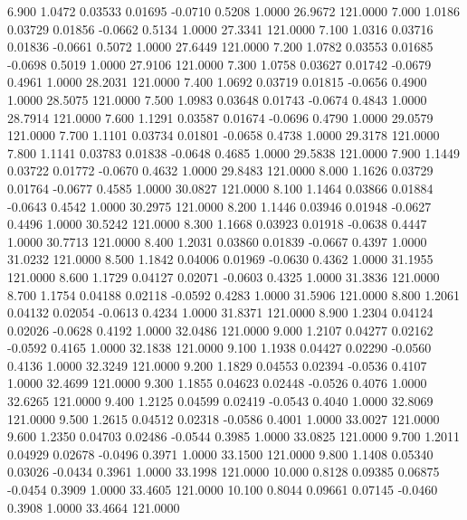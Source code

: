    6.900   1.0472   0.03533   0.01695  -0.0710   0.5208   1.0000  26.9672 121.0000
   7.000   1.0186   0.03729   0.01856  -0.0662   0.5134   1.0000  27.3341 121.0000
   7.100   1.0316   0.03716   0.01836  -0.0661   0.5072   1.0000  27.6449 121.0000
   7.200   1.0782   0.03553   0.01685  -0.0698   0.5019   1.0000  27.9106 121.0000
   7.300   1.0758   0.03627   0.01742  -0.0679   0.4961   1.0000  28.2031 121.0000
   7.400   1.0692   0.03719   0.01815  -0.0656   0.4900   1.0000  28.5075 121.0000
   7.500   1.0983   0.03648   0.01743  -0.0674   0.4843   1.0000  28.7914 121.0000
   7.600   1.1291   0.03587   0.01674  -0.0696   0.4790   1.0000  29.0579 121.0000
   7.700   1.1101   0.03734   0.01801  -0.0658   0.4738   1.0000  29.3178 121.0000
   7.800   1.1141   0.03783   0.01838  -0.0648   0.4685   1.0000  29.5838 121.0000
   7.900   1.1449   0.03722   0.01772  -0.0670   0.4632   1.0000  29.8483 121.0000
   8.000   1.1626   0.03729   0.01764  -0.0677   0.4585   1.0000  30.0827 121.0000
   8.100   1.1464   0.03866   0.01884  -0.0643   0.4542   1.0000  30.2975 121.0000
   8.200   1.1446   0.03946   0.01948  -0.0627   0.4496   1.0000  30.5242 121.0000
   8.300   1.1668   0.03923   0.01918  -0.0638   0.4447   1.0000  30.7713 121.0000
   8.400   1.2031   0.03860   0.01839  -0.0667   0.4397   1.0000  31.0232 121.0000
   8.500   1.1842   0.04006   0.01969  -0.0630   0.4362   1.0000  31.1955 121.0000
   8.600   1.1729   0.04127   0.02071  -0.0603   0.4325   1.0000  31.3836 121.0000
   8.700   1.1754   0.04188   0.02118  -0.0592   0.4283   1.0000  31.5906 121.0000
   8.800   1.2061   0.04132   0.02054  -0.0613   0.4234   1.0000  31.8371 121.0000
   8.900   1.2304   0.04124   0.02026  -0.0628   0.4192   1.0000  32.0486 121.0000
   9.000   1.2107   0.04277   0.02162  -0.0592   0.4165   1.0000  32.1838 121.0000
   9.100   1.1938   0.04427   0.02290  -0.0560   0.4136   1.0000  32.3249 121.0000
   9.200   1.1829   0.04553   0.02394  -0.0536   0.4107   1.0000  32.4699 121.0000
   9.300   1.1855   0.04623   0.02448  -0.0526   0.4076   1.0000  32.6265 121.0000
   9.400   1.2125   0.04599   0.02419  -0.0543   0.4040   1.0000  32.8069 121.0000
   9.500   1.2615   0.04512   0.02318  -0.0586   0.4001   1.0000  33.0027 121.0000
   9.600   1.2350   0.04703   0.02486  -0.0544   0.3985   1.0000  33.0825 121.0000
   9.700   1.2011   0.04929   0.02678  -0.0496   0.3971   1.0000  33.1500 121.0000
   9.800   1.1408   0.05340   0.03026  -0.0434   0.3961   1.0000  33.1998 121.0000
  10.000   0.8128   0.09385   0.06875  -0.0454   0.3909   1.0000  33.4605 121.0000
  10.100   0.8044   0.09661   0.07145  -0.0460   0.3908   1.0000  33.4664 121.0000
